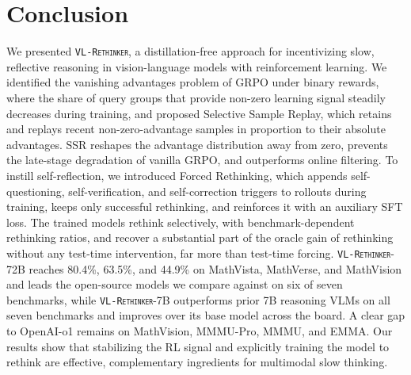 \documentclass{article}
\newcommand{\model}{\texttt{\textsc{VL-Rethinker}}\xspace}
\begin{document}
\section{Conclusion}
\label{sec:conclusion}

We presented \model, a distillation-free approach for incentivizing slow, reflective reasoning in vision-language models with reinforcement learning. We identified the vanishing advantages problem of GRPO under binary rewards, where the share of query groups that provide non-zero learning signal steadily decreases during training, and proposed Selective Sample Replay, which retains and replays recent non-zero-advantage samples in proportion to their absolute advantages. SSR reshapes the advantage distribution away from zero, prevents the late-stage degradation of vanilla GRPO, and outperforms online filtering. To instill self-reflection, we introduced Forced Rethinking, which appends self-questioning, self-verification, and self-correction triggers to rollouts during training, keeps only successful rethinking, and reinforces it with an auxiliary SFT loss. The trained models rethink selectively, with benchmark-dependent rethinking ratios, and recover a substantial part of the oracle gain of rethinking without any test-time intervention, far more than test-time forcing. \model-72B reaches 80.4\%, 63.5\%, and 44.9\% on MathVista, MathVerse, and MathVision and leads the open-source models we compare against on six of seven benchmarks, while \model-7B outperforms prior 7B reasoning VLMs on all seven benchmarks and improves over its base model across the board. A clear gap to OpenAI-o1 remains on MathVision, MMMU-Pro, MMMU, and EMMA. Our results show that stabilizing the RL signal and explicitly training the model to rethink are effective, complementary ingredients for multimodal slow thinking.




\end{document}
